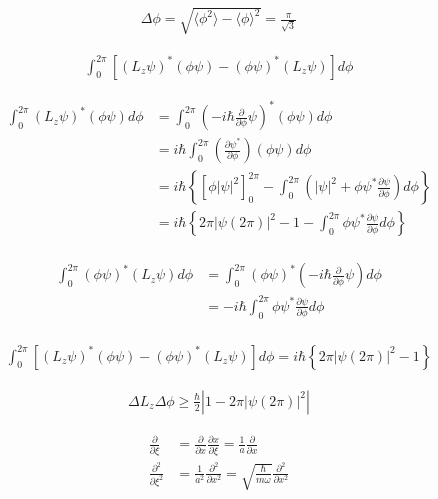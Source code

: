 \documentclass[11pt,pra,aps]{revtex4}
\begin{document}
\begin{align}
  \Delta\phi = \sqrt{\langle\phi^2\rangle-\langle\phi\rangle^2}=\frac{\pi}{\sqrt{3}}
\end{align}

\begin{align}
  \int^{2\pi}_0 \left[(L_z\psi)^{*}(\phi\psi)-(\phi\psi)^{*}(L_z\psi)\right]d\phi
\end{align}

\begin{align}
  \int^{2\pi}_0 (L_z\psi)^{*}(\phi\psi)d\phi &= \int^{2\pi}_0 \left(-i\hbar\frac{\partial}{\partial \phi}\psi\right)^{*}(\phi\psi)d\phi \\
  &= i\hbar \int^{2\pi}_0 \left(\frac{\partial \psi^{*}}{\partial \phi}\right)(\phi\psi)d\phi \\
  &= i\hbar \left\{[\phi|\psi|^2]^{2\pi}_0-\int^{2\pi}_0 \left(|\psi|^2+\phi\psi^{*}\frac{\partial\psi}{\partial\phi}\right) d\phi \right\}\\
  &= i\hbar \left\{2\pi|\psi(2\pi)|^2-1-\int^{2\pi}_0 \phi\psi^{*}\frac{\partial\psi}{\partial\phi} d\phi \right\}\\
\end{align}

\begin{align}
  \int^{2\pi}_0 (\phi\psi)^{*}(L_z\psi)d\phi &= \int^{2\pi}_0 (\phi\psi)^{*} \left(-i\hbar\frac{\partial}{\partial \phi}\psi\right)d\phi \\
  &= -i\hbar \int^{2\pi}_0 \phi\psi^{*} \frac{\partial \psi}{\partial \phi} d\phi \\
\end{align}

\begin{align}
  \int^{2\pi}_0 \left[(L_z\psi)^{*}(\phi\psi)-(\phi\psi)^{*}(L_z\psi)\right]d\phi = i\hbar \left\{2\pi|\psi(2\pi)|^2-1 \right\}
\end{align}

\begin{align}
  \Delta L_z \Delta \phi \geq \frac{\hbar}{2} \left|1-2\pi|\psi(2\pi)|^2\right|
\end{align}

\begin{align}
  \frac{\partial}{\partial \xi} &= \frac{\partial}{\partial x}\frac{\partial x}{\partial \xi}=\frac{1}{a}\frac{\partial}{\partial x} \\
  \frac{\partial^2}{\partial \xi^2} &=\frac{1}{a^2}\frac{\partial^2}{\partial x^2} = \sqrt{\frac{\hbar}{m\omega}}\frac{\partial^2}{\partial x^2}\\  
\end{align}
\end{document}
